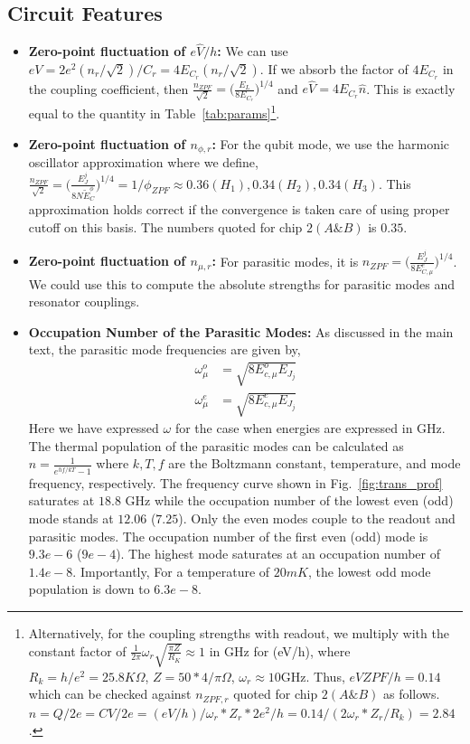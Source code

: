 \documentclass[%
reprint,
superscriptaddress,
 amsmath,amssymb,
 aps,
 prx,
longbibliography,
floatfix,
]{revtex4-2}
\begin{document}
\subsection{Circuit Features}
\begin{itemize}
    \item \textbf{Zero-point fluctuation of $e\hat V/h$:} We can use $eV=2e^2(n_r/\sqrt{2})/C_r=4E_{C_r}(n_r/\sqrt{2})$. If we absorb the factor of $4E_{C_r}$ in the coupling coefficient, then $\frac{n_{ZPF}}{\sqrt{2}}=\Big(\frac{E_L}{8E_{C_r}}\Big)^{1/4}$ and $e\hat V=4E_{C_r}\hat n$. This is exactly equal to the quantity in Table~\ref{tab:params}\footnote{Alternatively, for the coupling strengths with readout, we multiply with the constant factor of $\frac{1}{2\pi}\omega_r\sqrt{\frac{\pi Z}{R_K}}\approx 1$ in GHz for (eV/h), where $R_k=h/e^2=25.8K\Omega$, $Z=50*4/\pi\Omega$, $\omega_r\approx 10$GHz. Thus, $eVZPF/h=0.14$ which can be checked against $n_{ZPF,r}$ quoted for chip $2(A\&B)$ as follows. $n=Q/2e=CV/2e=(eV/h)/{\omega_r*Z_r*2e^2/h}=0.14/(2\omega_r*Z_r/R_k)=2.84$.}.
    \item \textbf{Zero-point fluctuation of $n_{\phi,r}$:} For the qubit mode, we use the harmonic oscillator approximation where we define, $\frac{n_{ZPF}}{\sqrt{2}}=\Big(\frac{E_J^j}{8N\tilde{E}_{C}^\phi}\Big)^{1/4}=1/\phi_{ZPF}\approx 0.36(H_1), 0.34 (H_2), 0.34 (H_3)$. This approximation holds correct if the convergence is taken care of using proper cutoff on this basis. The numbers quoted for chip $2(A\&B)$ is $0.35$.
    \item \textbf{Zero-point fluctuation of $n_{\mu,r}$:} For parasitic modes, it is $n_{ZPF}=\Big(\frac{E_J^j}{8E_{C,\mu}^e}\Big)^{1/4}$. We could use this to compute the absolute strengths for parasitic modes and resonator couplings. 

\item\textbf{Occupation Number of the Parasitic Modes:}
As discussed in the main text, the parasitic mode frequencies are given by,
\begin{align}
    \omega^o_\mu&=\sqrt{8E_{c,\mu}^oE_{J_j}}\\
    \omega^e_\mu&=\sqrt{8E_{c,\mu}^eE_{J_j}}
\end{align}
 Here we have expressed $\omega$ for the case when energies are expressed in GHz. The thermal population of the parasitic modes can be calculated as $n=\frac{1}{e^{hf/kT}-1}$ where $k, T, f$ are the Boltzmann constant, temperature, and mode frequency, respectively. The frequency curve shown in Fig.~\ref{fig:trans_prof} saturates at $18.8$ GHz while the occupation number of the lowest even (odd) mode stands at $12.06$ ($7.25$). Only the even modes couple to the readout and parasitic modes. The occupation number of the first even (odd) mode is $9.3e-6$ ($9e-4$). The highest mode saturates at an occupation number of $1.4e-8$. Importantly,  For a temperature of $20mK$, the lowest odd mode population is down to $6.3e-8$.

\end{itemize}
\end{document}
